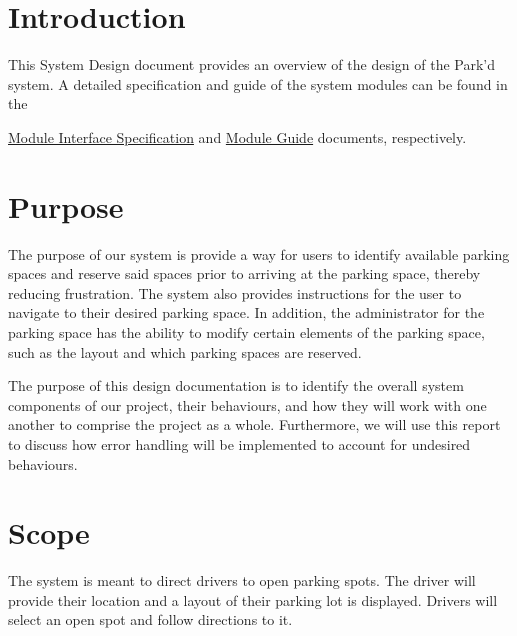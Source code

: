 \documentclass[12pt, titlepage]{article}
\begin{document}
\section{Introduction}

This System Design document provides an overview of the design of the Park'd
system. A detailed specification and guide of the system modules can be found in
the

\href{https://github.com/parkd-app/park-d/blob/main/docs/Design/SoftDetailedDes/MIS.pdf}{Module
Interface Specification} and
\href{https://github.com/parkd-app/park-d/blob/main/docs/Design/SoftArchitecture/MG.pdf}{Module
Guide} documents, respectively.

\section{Purpose}

The purpose of our system is provide a way for users to identify available
parking spaces and reserve said spaces prior to arriving at the parking space,
thereby reducing frustration. The system also provides instructions for the user
to navigate to their desired parking space. In addition, the administrator for
the parking space has the ability to modify certain elements of the parking
space, such as the layout and which parking spaces are reserved.

The purpose of this design documentation is to identify the overall system
components of our project, their behaviours, and how they will work with one
another to comprise the project as a whole. Furthermore, we will use this report
to discuss how error handling will be implemented to account for undesired
behaviours.

\section{Scope}

The system is meant to direct drivers to open parking spots. The driver will
provide their location and a layout of their parking lot is displayed. Drivers
will select an open spot and follow directions to it.
\end{document}
